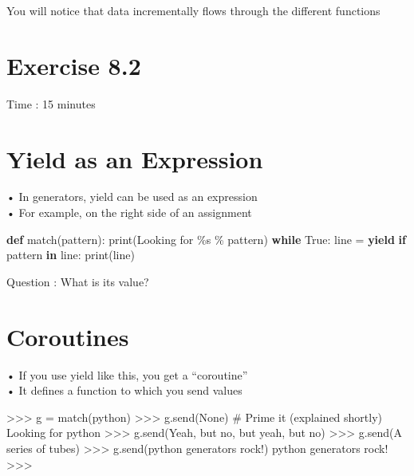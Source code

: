 \documentclass[
  letterpaper,
  DIV=11,
  numbers=noendperiod]{scrreprt}
\newenvironment{Shaded}{\begin{snugshade}}{\end{snugshade}}
\newcommand{\BuiltInTok}[1]{\textcolor[rgb]{0.00,0.23,0.31}{#1}}
\newcommand{\ControlFlowTok}[1]{\textcolor[rgb]{0.00,0.23,0.31}{\textbf{#1}}}
\newcommand{\KeywordTok}[1]{\textcolor[rgb]{0.00,0.23,0.31}{\textbf{#1}}}
\newcommand{\NormalTok}[1]{\textcolor[rgb]{0.00,0.23,0.31}{#1}}
\newcommand{\OperatorTok}[1]{\textcolor[rgb]{0.37,0.37,0.37}{#1}}
\newcommand{\SpecialCharTok}[1]{\textcolor[rgb]{0.37,0.37,0.37}{#1}}
\newcommand{\StringTok}[1]{\textcolor[rgb]{0.13,0.47,0.30}{#1}}
\newcommand{\VariableTok}[1]{\textcolor[rgb]{0.07,0.07,0.07}{#1}}
\begin{document}
You will notice that data incrementally flows through the different
functions


\chapter{Exercise 8.2}\label{exercise-8.2}

Time : 15 minutes


\chapter{Yield as an Expression}\label{yield-as-an-expression}

• In generators, yield can be used as an expression\\
• For example, on the right side of an assignment

\begin{Shaded}
\begin{Highlighting}[]
\KeywordTok{def}\NormalTok{ match(pattern):}
    \BuiltInTok{print}\NormalTok{(}\StringTok{\textquotesingle{}Looking for }\SpecialCharTok{\%s}\StringTok{\textquotesingle{}} \OperatorTok{\%}\NormalTok{ pattern)}
\ControlFlowTok{while} \VariableTok{True}\NormalTok{:}
\NormalTok{    line }\OperatorTok{=} \ControlFlowTok{yield}
    \ControlFlowTok{if}\NormalTok{ pattern }\KeywordTok{in}\NormalTok{ line:}
        \BuiltInTok{print}\NormalTok{(line) }
\end{Highlighting}
\end{Shaded}

Question : What is its value?


\chapter{Coroutines}\label{coroutines}

• If you use yield like this, you get a ``coroutine''\\
• It defines a function to which you send values

\begin{Shaded}
\begin{Highlighting}[]
\NormalTok{\textgreater{}\textgreater{}\textgreater{} g = match(\textquotesingle{}python\textquotesingle{})}
\NormalTok{\textgreater{}\textgreater{}\textgreater{} g.send(None) \# Prime it (explained shortly)}
\NormalTok{Looking for python}
\NormalTok{\textgreater{}\textgreater{}\textgreater{} g.send(\textquotesingle{}Yeah, but no, but yeah, but no\textquotesingle{})}
\NormalTok{\textgreater{}\textgreater{}\textgreater{} g.send(\textquotesingle{}A series of tubes\textquotesingle{})}
\NormalTok{\textgreater{}\textgreater{}\textgreater{} g.send(\textquotesingle{}python generators rock!\textquotesingle{})}
\NormalTok{python generators rock!}
\NormalTok{\textgreater{}\textgreater{}\textgreater{} }
\end{Highlighting}
\end{Shaded}
\end{document}
